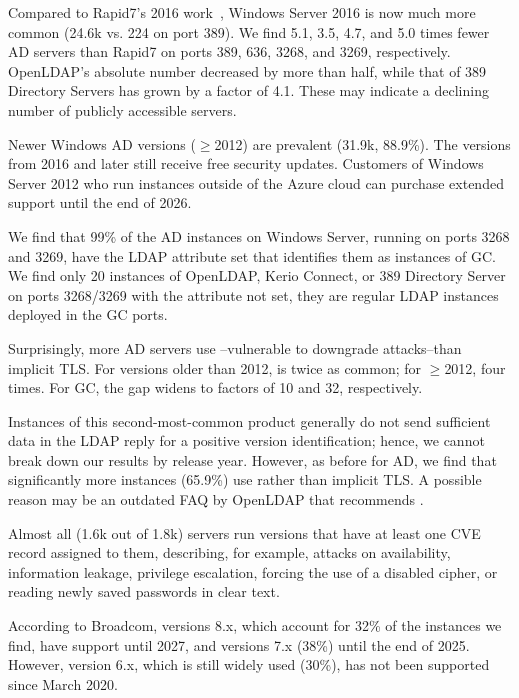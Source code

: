 Compared to Rapid7's 2016 work~\cite{project_sonar_rapid7}, Windows Server 2016 is now much more common (24.6k vs. 224 on port 389). We find 5.1, 3.5, 4.7, and 5.0 times fewer \gls{AD} servers than Rapid7 on ports 389, 636, 3268, and 3269, respectively. OpenLDAP's absolute number decreased by more than half, while that of 389 Directory Servers has grown by a factor of 4.1. These may  indicate a declining number of publicly accessible servers.

Newer Windows \gls{AD} versions ($\geq$2012) are prevalent (31.9k, 88.9\%). The versions from 2016 and later still receive free security updates. Customers of Windows Server 2012 who run instances outside of the Azure cloud can purchase extended support until the end of 2026.

We find that 99\% of the \gls{AD} instances on Windows Server, running on ports 3268 and 3269, have the LDAP attribute set that identifies them as instances of \gls{GC}.
We find only 20 instances of OpenLDAP, Kerio Connect, or 389 Directory Server on ports 3268/3269 with the attribute not set, \ie they are regular \gls{LDAP} instances deployed in the \gls{GC} ports.

Surprisingly, more \gls{AD} servers use \starttls--vulnerable to downgrade attacks--than implicit TLS. For versions older than 2012, \starttls is twice as common; for $\geq$2012, four times. For \gls{GC}, the gap widens to factors of 10 and 32, respectively.

Instances of this second-most-common product generally do not send sufficient data in the \gls{LDAP} reply for a positive version identification; hence, we cannot break down our results by release year. However, as before for \gls{AD}, we find that significantly more instances (65.9\%) use \starttls rather than implicit \gls{TLS}. A possible reason may be an outdated FAQ by OpenLDAP that recommends \starttls \cite{OpenLDAPFaqOMaticStart}. 

Almost all (1.6k out of 1.8k) servers run versions that have at least one CVE record assigned to them, describing, for example, attacks on availability, information leakage, privilege escalation, forcing the use of a disabled cipher, or reading newly saved passwords in clear text.

According to Broadcom, versions 8.x, which account for 32\% of the instances we find, have support until 2027, and versions 7.x (38\%) until the end of 2025. However, version 6.x, which is still widely used (30\%), has not been supported since March 2020.

